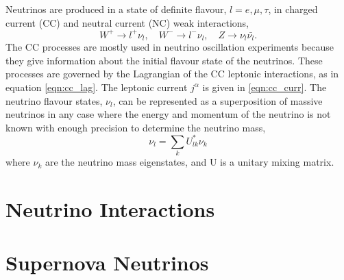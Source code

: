 Neutrinos are produced in a state of definite flavour, \(l = e, \mu, \tau\), in 
charged current (CC) and neutral current (NC) weak interactions, 
\begin{equation}
	W^+ \rightarrow l^+ \nu_l, \quad  W^- \rightarrow l^- \nu_l, \quad  Z   \rightarrow \nu_l \bar{\nu_l}.
\end{equation}
The CC processes are mostly used in neutrino oscillation experiments because
they give information about the initial flavour state of the neutrinos. These
processes are governed by the Lagrangian of the CC leptonic interactions, as in
equation \ref{eqn:cc_lag}. The leptonic current \(j^\alpha\) is given in 
\ref{eqn:cc_curr}. The neutrino flavour states, $\nu_l$, can be represented as a 
superposition of massive neutrinos in any case where the energy and momentum 
of the neutrino is not known with enough precision to determine the neutrino 
mass,
\begin{equation}
	\nu_l = \sum_{k} U^*_{lk} \nu_k
\end{equation}
where $\nu_k$ are the neutrino mass eigenstates, and U is a unitary mixing
matrix.

\section{Neutrino Interactions} \label{nu_prod}

\section{Supernova Neutrinos} \label{nu_sn}
